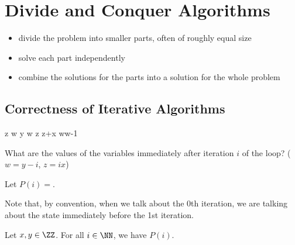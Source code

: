 \documentclass[11pt]{scrartcl}
\begin{document}
\section{Divide and Conquer Algorithms}

\begin{itemize}
\item divide the problem into smaller parts, often of roughly equal size
\item solve each part independently
\item combine the solutions for the parts into a solution for the whole problem
\end{itemize}

\subsection{Correctness of Iterative Algorithms}

\begin{program}

z
w \gets y
\WHILE w  \DO
z \gets z+x
w\gets w-1
\OD
\end{program}

What are the values of the variables immediately after iteration $i$
of the loop? ($w=y-i$, $z = ix$)

Let $P(i)=$.

Note that, by convention, when we talk about the 0th iteration, we are
talking about the state immediately before the 1st iteration.

\begin{lemma}
\label{sec:corr-iter-algor}
Let $x, y \in\ZZ$. For all $i\in\NN$, we have $P(i)$.
\end{lemma}
\end{document}
